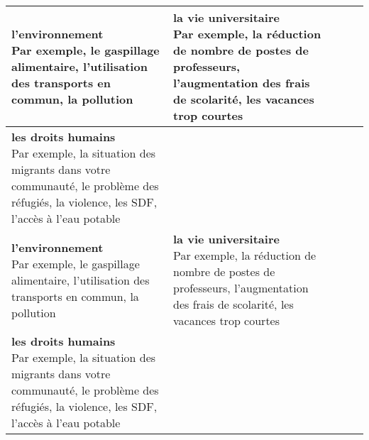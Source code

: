 \documentclass{article}
\date{}
\newcommand{\tabrowEnd}{\\}
\begin{document}
  \centering
  \noindent
  {\LARGE
    \begin{tabular}{| p{0.5\tabcolsep} | p{0.5\tabcolsep} |}
      \hline
      \parbox{\linewidth}{\textbf{l'environnement}\\
                          Par exemple, le gaspillage alimentaire, l'utilisation des transports en commun, la pollution\\} &
      \parbox{\linewidth}{\textbf{la vie universitaire}\\
                          Par exemple, la réduction de nombre de postes de professeurs, l'augmentation des frais de scolarité, les vacances trop courtes} \tabrowEnd
      \hline
      \parbox{\linewidth}{\textbf{les droits humains}\\
                          Par exemple, la situation des migrants dans votre communauté, le problème des réfugiés, la violence, les SDF, l'accès à l'eau potable} & \tabrowEnd
      \hline
      \parbox{\linewidth}{\textbf{l'environnement}\\
                          Par exemple, le gaspillage alimentaire, l'utilisation des transports en commun, la pollution\\} &
      \parbox{\linewidth}{\textbf{la vie universitaire}\\
                          Par exemple, la réduction de nombre de postes de professeurs, l'augmentation des frais de scolarité, les vacances trop courtes} \tabrowEnd
      \hline
      \parbox{\linewidth}{\textbf{les droits humains}\\
                          Par exemple, la situation des migrants dans votre communauté, le problème des réfugiés, la violence, les SDF, l'accès à l'eau potable} & \tabrowEnd
      \hline
    \end{tabular}
  }
\end{document}
